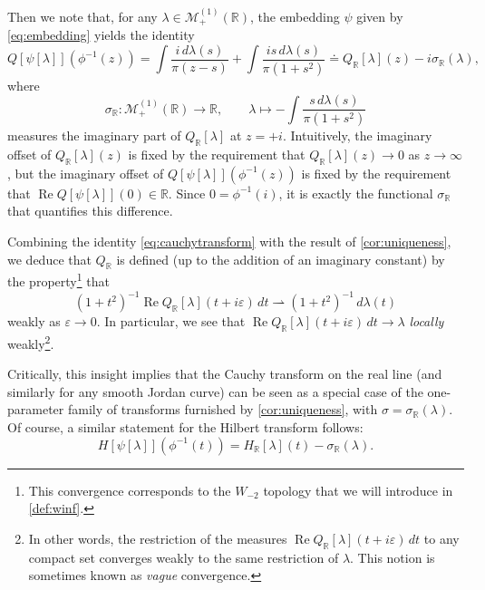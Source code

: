 \documentclass{cams-l} %
\newcommand{\dave}[1]{#1}\newcommand{\davebegin}{}\newcommand{\daveend}{}\newcommand{\george}[1]{#1}
\newcommand{\RR}{\mathbb R}
\newcommand{\cM}{\mathcal M}
\newcommand{\eps}{\varepsilon}
\newcommand{\op}{\operatorname}
\renewcommand{\Re}{\op{Re}}
\theoremstyle{definition}
\theoremstyle{remark}
\numberwithin{equation}{section}
\begin{document}
Then we note that, for any $\lambda\in\cM_+^{(1)}(\RR)$, the embedding $\psi$ given by \cref{eq:embedding} yields the identity
\begin{equation}\label{eq:cauchytransform}
    Q[\psi[\lambda]](\phi^{-1}(z)) = \int\frac{i\,d\lambda(s)}{\pi (z-s)} + \int\frac{is\,d\lambda(s)}{\pi(1+s^2)} \doteq Q_\RR[\lambda](z) - i\sigma_\RR(\lambda), 
\end{equation}
where \[\sigma_\RR:\cM_+^{(1)}(\RR)\to\RR,\qquad \lambda\mapsto -\int\frac{s\,d\lambda(s)}{\pi(1+s^2)} \]
measures the imaginary part of $Q_\RR[\lambda]$ at $z=+i$. Intuitively, the imaginary offset of $Q_\RR[\lambda](z)$ is fixed by the requirement that $Q_\RR[\lambda](z)\to 0$ as $z\to\infty$, but the imaginary offset of $Q[\psi[\lambda]](\phi^{-1}(z))$ is fixed by the requirement that $\Re Q[\psi[\lambda]](0)\in\RR$. Since $0=\phi^{-1}(i)$, it is exactly the functional $\sigma_\RR$ that quantifies this difference. 

Combining the identity \cref{eq:cauchytransform} with the result of \cref{cor:uniqueness}, we deduce that $Q_\RR$ is defined (up to the addition of an imaginary constant) by the property\footnote{\dave{This convergence corresponds to the $W_{-2}$ topology that we will introduce in \cref{def:winf}.}} that
\[(1+t^2)^{-1}\Re Q_\RR[\lambda](t+i\eps)\,dt \rightharpoonup (1+t^2)^{-1}\,d\lambda(t)\]
weakly as $\eps\to 0$. In particular, we see that $\Re Q_\RR[\lambda](t+i\eps)\,dt \to \lambda$ \emph{locally} weakly\footnote{In other words, the restriction of the measures $\Re Q_\RR[\lambda](t+i\eps)\,dt$ to any compact set converges weakly to the same restriction of $\lambda$. This notion is sometimes known as \emph{vague} convergence.}. 

Critically, this insight implies that the Cauchy transform on the real line (and similarly for any smooth Jordan curve) can be seen as a special case of the one-parameter family of transforms furnished by \cref{cor:uniqueness}, with $\sigma = \sigma_\RR(\lambda)$. Of course, a similar statement for the Hilbert transform follows:
\begin{equation}\label{eq:H_real2circ}
    H[\psi[\lambda]](\phi^{-1}(t)) = H_\RR[\lambda](t) - \sigma_\RR(\lambda).
\end{equation}
\end{document}
